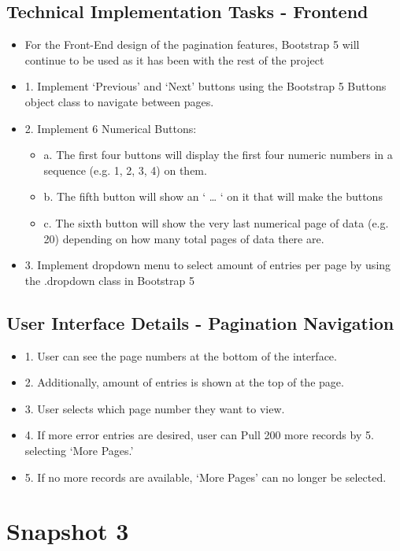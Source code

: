 \documentclass[12pt]{article}
\begin{document}
\subsection*{Technical Implementation Tasks - Frontend}
\begin{itemize}
    \item For the Front-End design of the pagination features, Bootstrap 5 will continue to be used as it has been with the rest of the project
    \item 1. Implement ‘Previous’ and ‘Next’ buttons using the Bootstrap 5 Buttons object class to navigate between pages.
    \item 2. Implement 6 Numerical Buttons:
    \begin{itemize}
    \item a. The first four buttons will display the first four numeric numbers in a sequence (e.g. 1, 2, 3, 4) on them.
    \item b. The fifth button will show an ‘ … ‘ on it that will make the buttons 
    \item c. The sixth button will show the very last numerical page of data (e.g. 20) depending on how many total pages of data there are.
    \end{itemize}
    \item 3. Implement dropdown menu to select amount of entries per page by using the .dropdown class in Bootstrap 5
\end{itemize}

\subsection*{User Interface Details - Pagination Navigation}
\begin{itemize}
\item 1. User can see the page numbers at the bottom of the interface.
\item 2. Additionally, amount of entries is shown at the top of the page.
\item 3. User selects which page number they want to view.
\item 4. If more error entries are desired, user can Pull 200 more records by 5. selecting ‘More Pages.’
\item 5. If no more records are available, ‘More Pages’ can no longer be selected.
\end{itemize}




\section{Snapshot 3}
\end{document}

